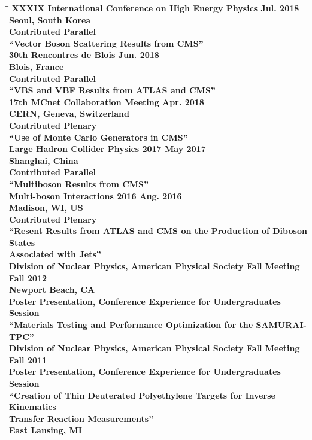\documentclass[10pt]{res} %
\begin{document}
\begin{resume}
\begin{tabbing}
\hspace{2.3in}\= \hspace{2.6in}\= \kill %
\bf{XXXIX International Conference on High Energy Physics} 		 \> \>	    Jul. 2018 \\
Seoul, South Korea\\
Contributed Parallel\\ 
``Vector Boson Scattering Results from CMS'' \\
\bf{30th Rencontres de Blois} 		 \> \>	    Jun. 2018 \\
Blois, France\\
Contributed Parallel\\ 
``VBS and VBF Results from ATLAS and CMS'' \\
\bf{17th MCnet Collaboration Meeting} 		 \> \>	    Apr. 2018 \\
CERN, Geneva, Switzerland \\
Contributed Plenary\\ 
``Use of Monte Carlo Generators in CMS'' \\
\bf{Large Hadron Collider Physics 2017} 		 \> \>	    May 2017 \\
Shanghai, China \\
Contributed Parallel \\ 
``Multiboson Results from CMS'' \\

\bf{Multi-boson Interactions 2016} 		 \> \>	    Aug. 2016 \\
Madison, WI, US \\
Contributed Plenary \\ 
``Resent Results from ATLAS and CMS on the Production of Diboson States \\Associated with Jets'' \\
\bf{Division of Nuclear Physics, American Physical Society Fall Meeting} 		 \> \>	    Fall 2012 \\
Newport Beach, CA \\
Poster Presentation, Conference Experience for Undergraduates Session\\ 
``Materials Testing and Performance Optimization for the SAMURAI-TPC'' \\
\bf{Division of Nuclear Physics, American Physical Society Fall Meeting} 		 \> \>	    Fall 2011 \\
Poster Presentation, Conference Experience for Undergraduates Session\\ 
``Creation of Thin Deuterated Polyethylene Targets for Inverse Kinematics \\Transfer Reaction Measurements'' \\
East Lansing, MI \\
\end{tabbing}


\end{resume}
\end{document}
